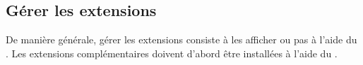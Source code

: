 %

\subsection{Gérer les extensions}\label{sec:managing_plugins}

De manière générale, gérer les extensions consiste à les afficher ou pas à l'aide du .
Les extensions complémentaires doivent d'abord être installées à l'aide du .






